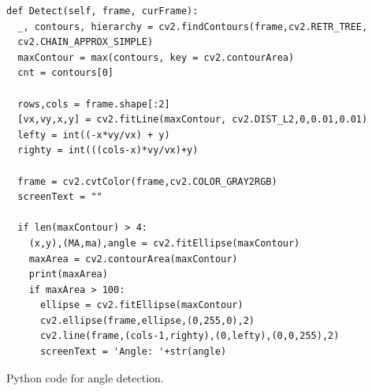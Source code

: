 \documentclass[11pt,a4paper]{report}
\begin{document}
\begin{listing}
\begin{verbatim}
def Detect(self, frame, curFrame):
  _, contours, hierarchy = cv2.findContours(frame,cv2.RETR_TREE,
  cv2.CHAIN_APPROX_SIMPLE)
  maxContour = max(contours, key = cv2.contourArea)
  cnt = contours[0]

  rows,cols = frame.shape[:2]
  [vx,vy,x,y] = cv2.fitLine(maxContour, cv2.DIST_L2,0,0.01,0.01)
  lefty = int((-x*vy/vx) + y)
  righty = int(((cols-x)*vy/vx)+y)

  frame = cv2.cvtColor(frame,cv2.COLOR_GRAY2RGB)
  screenText = ""

  if len(maxContour) > 4:
    (x,y),(MA,ma),angle = cv2.fitEllipse(maxContour)
    maxArea = cv2.contourArea(maxContour)
    print(maxArea)
    if maxArea > 100:
      ellipse = cv2.fitEllipse(maxContour)
      cv2.ellipse(frame,ellipse,(0,255,0),2)
      cv2.line(frame,(cols-1,righty),(0,lefty),(0,0,255),2)
      screenText = 'Angle: '+str(angle)
\end{verbatim}
\caption{Python code for angle detection.}
\label{angleDetectionPython}
\end{listing}
\end{document}
